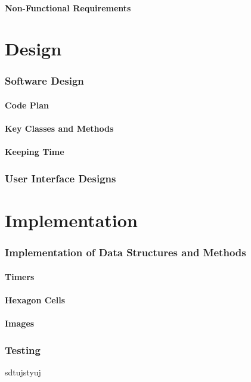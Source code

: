 \documentclass[10pt,a4paper]{article}
\begin{document}
\subsection{Non-Functional Requirements}


\part{Design}
\section{Software Design}
\subsection{Code Plan}
\subsection{Key Classes and Methods}
\subsection{Keeping Time}

\section{User Interface Designs}

\part{Implementation}
\section{Implementation of Data Structures and Methods}
\subsection{Timers}
\subsection{Hexagon Cells}
\subsection{Images}

\section{Testing}
sdtujstyuj
\end{document}
